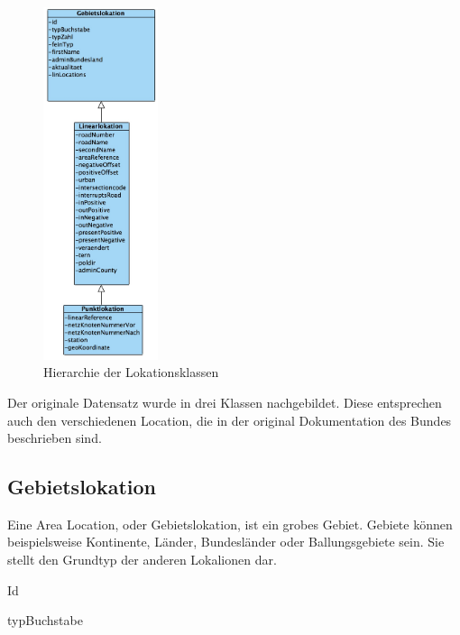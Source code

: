 \documentclass[12pt, a4paper, ngerman]{article}
\begin{document}
\begin{figure}[htbp] 
  \centering
     \includegraphics[width=0.3\textwidth]{Grafiken/klassenDiagrammLokations.jpg}
  \caption{Hierarchie der Lokationsklassen}
  \label{fig:klassendiagrammLokations}
\end{figure}

Der originale Datensatz wurde in drei Klassen nachgebildet. Diese entsprechen auch den verschiedenen Location, die in der original Dokumentation des Bundes beschrieben sind.
\subsection{Gebietslokation \label{AreaLocation}}
Eine Area Location, oder Gebietslokation, ist ein grobes Gebiet. Gebiete können beispielsweise Kontinente, Länder, Bundesländer oder Ballungsgebiete sein. Sie stellt den Grundtyp der anderen Lokalionen dar.

\begin{attribut}{Id}
\end{attribut}

\begin{attribut}{typBuchstabe}
\end{attribut}
\end{document}

